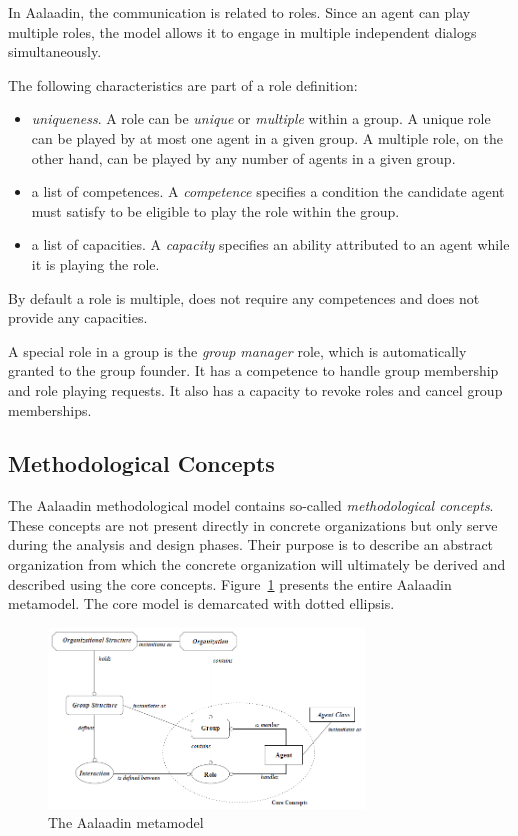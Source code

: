 In Aalaadin, the communication is related to roles. Since an agent can play multiple roles, the model allows it to engage in multiple independent dialogs simultaneously.

The following characteristics are part of a role definition:
\begin{itemize}
	\item \textit{uniqueness}. A role can be \textit{unique} or \textit{multiple} within a group.
	A unique role can be played by at most one agent in a given group.
	A multiple role, on the other hand, can be played by any number of agents in a given group. 
	\item a list of competences. A \textit{competence} specifies a condition the candidate agent must satisfy to be eligible to play the role within the group. 
	\item a list of capacities. A \textit{capacity} specifies an ability attributed to an agent while it is playing the role.
\end{itemize}
By default a role is multiple, does not require any competences and does not provide any capacities.

A special role in a group is the \textit{group manager} role, which is automatically granted to the group founder.
It has a competence to handle group membership and role playing requests.
It also has a capacity to revoke roles and cancel group memberships.

\subsection{Methodological Concepts}

The Aalaadin methodological model contains so-called \textit{methodological concepts}.
These concepts are not present directly in concrete organizations but only serve during the analysis and design phases.
Their purpose is to describe an abstract organization from which the concrete organization will ultimately be derived and described using the core concepts.
Figure~\ref{figure:aalaadin-metamodel} presents the entire Aalaadin metamodel. The core model is demarcated with dotted ellipsis.

\begin{figure}[h]
	\centering
	\includegraphics[width=0.75\textwidth]{images/aalaadin-metamodel.png}
	\caption{The Aalaadin metamodel}
	\label{figure:aalaadin-metamodel}
\end{figure}

